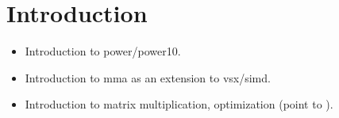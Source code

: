 \documentclass[\main/thesis.tex]{subfiles}
\begin{document}
\chapter{Introduction}
\label{cha:intro}

\begin{itemize}
  \item Introduction to \gls{power}/\gls{power10}.
  \item Introduction to \gls{mma} as an extension to \gls{vsx}/\gls{simd}.
  \item Introduction to matrix multiplication, optimization (point to ).
\end{itemize}
\end{document}

